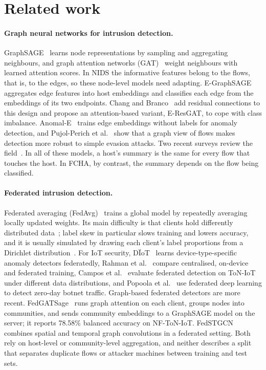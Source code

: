 \documentclass[pdflatex,sn-mathphys-num]{sn-jnl}
\begin{document}
\section{Related work}\label{sec:related}

\paragraph{Graph neural networks for intrusion detection.} GraphSAGE~\cite{hamilton2017graphsage} learns node representations by sampling and aggregating neighbours, and graph attention networks (GAT)~\cite{velickovic2018gat} weight neighbours with learned attention scores. In NIDS the informative features belong to the flows, that is, to the edges, so these node-level models need adapting. E-GraphSAGE~\cite{lo2022egraphsage} aggregates edge features into host embeddings and classifies each edge from the embeddings of its two endpoints. Chang and Branco~\cite{chang2024eres} add residual connections to this design and propose an attention-based variant, E-ResGAT, to cope with class imbalance. Anomal-E~\cite{caville2022anomale} trains edge embeddings without labels for anomaly detection, and Pujol-Perich et al.~\cite{pujolperich2022unveiling} show that a graph view of flows makes detection more robust to simple evasion attacks. Two recent surveys review the field~\cite{bilot2023survey,zhong2024survey}. In all of these models, a host's summary is the same for every flow that touches the host. In FCHA, by contrast, the summary depends on the flow being classified.

\paragraph{Federated intrusion detection.} Federated averaging (FedAvg)~\cite{mcmahan2017fedavg} trains a global model by repeatedly averaging locally updated weights. Its main difficulty is that clients hold differently distributed data~\cite{li2020flchallenges,kairouz2021advances}; label skew in particular slows training and lowers accuracy, and it is usually simulated by drawing each client's label proportions from a Dirichlet distribution~\cite{li2022noniid}. For IoT security, D\"IoT~\cite{nguyen2019diot} learns device-type-specific anomaly detectors federatedly, Rahman et al.~\cite{rahman2020iotids} compare centralised, on-device and federated training, Campos et al.~\cite{campos2022evaluating} evaluate federated detection on ToN-IoT under different data distributions, and Popoola et al.~\cite{popoola2022zeroday} use federated deep learning to detect zero-day botnet traffic. Graph-based federated detectors are more recent. FedGATSage~\cite{altfaily2025fedgatsage} runs graph attention on each client, groups nodes into communities, and sends community embeddings to a GraphSAGE model on the server; it reports 78.58\% balanced accuracy on NF-ToN-IoT. FedSTGCN~\cite{wang2025fedstgcn} combines spatial and temporal graph convolutions in a federated setting. Both rely on host-level or community-level aggregation, and neither describes a split that separates duplicate flows or attacker machines between training and test sets.
\end{document}
